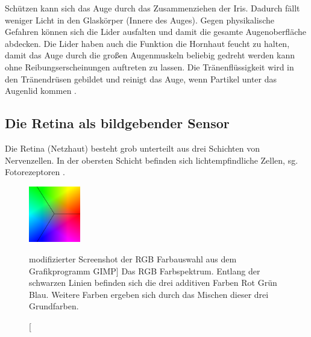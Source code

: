 \documentclass[12pt,a4paper]{article}
\begin{document}
Schützen kann sich das Auge durch das Zusammenziehen der Iris. Dadurch fällt
weniger Licht in den Glaskörper (Innere des Auges). Gegen physikalische
Gefahren können sich die Lider ausfalten und damit die gesamte Augenoberfläche
abdecken. Die Lider haben auch die Funktion die Hornhaut feucht zu halten,
damit das Auge durch die großen Augenmuskeln beliebig gedreht werden kann
ohne Reibungserscheinungen auftreten zu lassen. Die Tränenflüssigkeit
wird in den Tränendrüsen gebildet
und reinigt das Auge, wenn Partikel unter das Augenlid kommen \cite{anatomie}.

\subsection{Die Retina als bildgebender Sensor}


Die Retina (Netzhaut) besteht grob unterteilt aus drei
Schichten von Nervenzellen. In der obersten Schicht befinden sich
lichtempfindliche Zellen, sg. Fotorezeptoren \cite{retinapathways}.

\begin{figure}[p]
  \begin{center}
    \includegraphics[width=0.2\textwidth]{imgs/rgb.pdf}
    \caption
     [modifizierter Screenshot der RGB Farbauswahl aus dem Grafikprogramm GIMP]
     {Das RGB Farbspektrum. Entlang der schwarzen Linien befinden sich
      die drei additiven Farben Rot Grün Blau. Weitere Farben ergeben sich
      durch das Mischen dieser drei Grundfarben.}
    \label{img:rgb}
  \end{center}
\end{figure}
\end{document}
